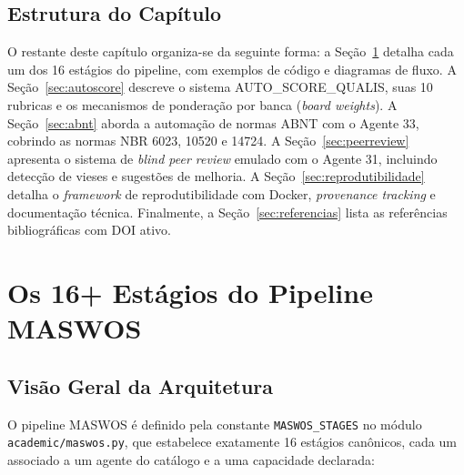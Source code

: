 \subsection{Estrutura do Capítulo}
\label{sec:estrutura_capitulo}

O restante deste capítulo organiza-se da seguinte forma: a
Seção~\ref{sec:estagios} detalha cada um dos 16 estágios do
pipeline, com exemplos de código e diagramas de fluxo. A
Seção~\ref{sec:autoscore} descreve o sistema AUTO\_SCORE\_QUALIS,
suas 10 rubricas e os mecanismos de ponderação por banca
(\textit{board weights}). A Seção~\ref{sec:abnt} aborda a
automação de normas ABNT com o Agente 33, cobrindo as normas NBR
6023, 10520 e 14724. A Seção~\ref{sec:peerreview} apresenta o
sistema de \textit{blind peer review} emulado com o Agente 31,
incluindo detecção de vieses e sugestões de melhoria. A
Seção~\ref{sec:reprodutibilidade} detalha o \textit{framework} de
reprodutibilidade com Docker, \textit{provenance tracking} e
documentação técnica. Finalmente, a Seção~\ref{sec:referencias}
lista as referências bibliográficas com DOI ativo.

\section{Os 16+ Estágios do Pipeline MASWOS}
\label{sec:estagios}

\subsection{Visão Geral da Arquitetura}
\label{sec:visao_geral}

O pipeline MASWOS é definido pela constante \texttt{MASWOS\_STAGES}
no módulo \texttt{academic/maswos.py}, que estabelece exatamente 16
estágios canônicos, cada um associado a um agente do catálogo e a
uma capacidade declarada:

